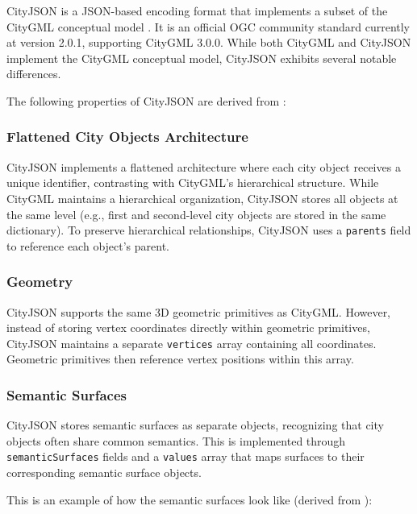 CityJSON is a JSON-based \citep{json} encoding format that implements a subset of the CityGML conceptual model \citep{CityGML}. It is an official OGC community standard \citep{ogc} currently at version 2.0.1, supporting CityGML 3.0.0. While both CityGML and CityJSON implement the CityGML conceptual model, CityJSON exhibits several notable differences.

The following properties of CityJSON are derived from \citet{ledoux_2019}:

\subsubsection{Flattened City Objects Architecture}
\label{rw:cityjson:flattened_architecture}

CityJSON implements a flattened architecture where each city object receives a unique identifier, contrasting with CityGML's hierarchical structure. While CityGML maintains a hierarchical organization, CityJSON stores all objects at the same level (e.g., first and second-level city objects are stored in the same dictionary). To preserve hierarchical relationships, CityJSON uses a \texttt{parents} field to reference each object's parent.

\subsubsection{Geometry}
\label{rw:cityjson:geometry}

CityJSON supports the same 3D geometric primitives as CityGML. However, instead of storing vertex coordinates directly within geometric primitives, CityJSON maintains a separate \texttt{vertices} array containing all coordinates. Geometric primitives then reference vertex positions within this array.

\subsubsection{Semantic Surfaces}
\label{rw:cityjson:semantic_surfaces}

CityJSON stores semantic surfaces as separate objects, recognizing that city objects often share common semantics. This is implemented through \texttt{semanticSurfaces} fields and a \texttt{values} array that maps surfaces to their corresponding semantic surface objects.

This is an example of how the semantic surfaces look like (derived from \citet{ledoux_2019}):

